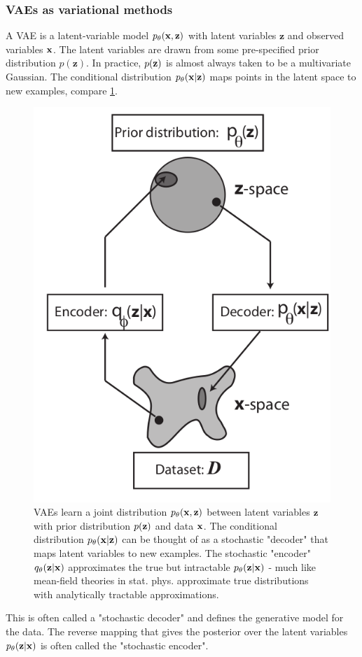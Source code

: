 \subsubsection{VAEs as variational methods}
A VAE is a latent-variable model $p_\theta(\mathbf{x},\mathbf{z})$ with latent variables $\mathbf{z}$ and observed variables $\mathbf{x}$. The latent variables are drawn from some pre-specified prior distribution $p(\mathbf{z})$. In practice, $p(\mathbf{z})$ is almost always taken to be a multivariate Gaussian. The conditional distribution $p_\theta(\mathbf{x}|\mathbf{z})$ maps points in the latent space to new examples, compare \ref{fig:vae1}.


\begin{figure}[h!]
	\centering
	\includegraphics[width=0.7\linewidth]{gfx/vae1}
	\caption{VAEs learn a joint distribution $p_\theta(\mathbf{x},\mathbf{z})$ between latent variables $\mathbf{z}$ with prior distribution $p(\mathbf{z})$ and data $\mathbf{x}$. The conditional distribution $p_\theta(\mathbf{x} |\mathbf{z})$ can be thought of as a stochastic "decoder" that maps latent variables to new examples. The stochastic "encoder" $q_\theta(\mathbf{z}|\mathbf{x})$ approximates the true but intractable $p_\theta(\mathbf{z}|\mathbf{x})$ - much like mean-field theories in stat. phys. approximate true distributions with analytically tractable approximations. }
	\label{fig:vae1}
\end{figure}
 This is often called a "stochastic decoder" and defines the generative model for the data. The reverse mapping that gives the posterior over the latent variables $p_\theta(\mathbf{z} |\mathbf{x})$ is often called the "stochastic encoder".\\
